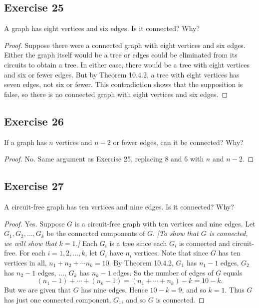 \documentclass[14pt]{extarticle}
\begin{document}
\subsection{Exercise 25}
A graph has eight vertices and six edges. Is it connected? Why?

\begin{proof}
Suppose there were a connected graph with eight vertices and six edges. Either the graph itself would be a tree or edges 
could be eliminated from its circuits to obtain a tree. In either case, there would be a tree with eight vertices and six 
or fewer edges. But by Theorem 10.4.2, a tree with eight vertices has seven edges, not six or fewer. This contradiction 
shows that the supposition is false, so there is no connected graph with eight vertices and six edges.
\end{proof}

\subsection{Exercise 26}
If a graph has \(n\) vertices and \(n - 2\) or fewer edges, can it be connected? Why?

\begin{proof}
No. Same argument as Exercise 25, replacing 8 and 6 with \(n\) and \(n-2\).
\end{proof}

\subsection{Exercise 27}
A circuit-free graph has ten vertices and nine edges. Is it connected? Why?

\begin{proof}
Yes. Suppose \(G\) is a circuit-free graph with ten vertices and nine edges. Let \(G_1, G_2, \ldots, G_k\) be the connected 
components of \(G\). {\it [To show that \(G\) is connected, we will show that \(k = 1\).]} Each \(G_i\) is a tree since each 
\(G_i\) is connected and circuit-free. For each \(i = 1, 2, \ldots, k\), let \(G_i\) have \(n_i\) vertices. Note that 
since \(G\) has ten vertices in all, \(n_1 + n_2 + \cdots n_k = 10\). By Theorem 10.4.2, \(G_1\) has \(n_1 - 1\) edges, 
\(G_2\) has \(n_2 - 1\) edges, \(\ldots\), \(G_k\) has \(n_k - 1\) edges. So the number of edges of \(G\) equals
\[
(n_1 - 1) + \cdots + (n_k - 1) = (n_1 + \cdots + n_k) - k = 10-k.
\]
But we are given that \(G\) has nine edges. Hence \(10 - k = 9\), and so \(k = 1\). Thus \(G\) has just one connected 
component, \(G_1\), and so \(G\) is connected.
\end{proof}
\end{document}
